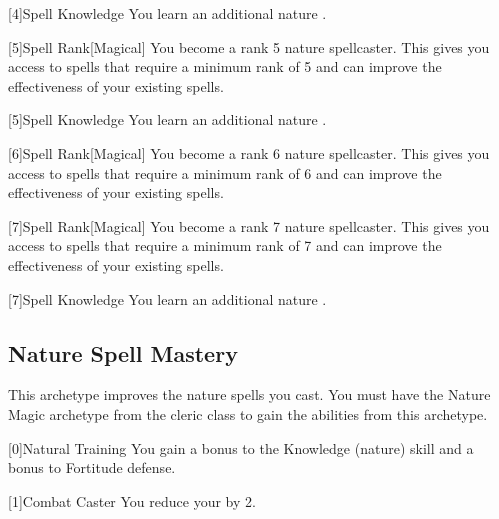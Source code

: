         [4]{Spell Knowledge} You learn an additional nature .

        [5]{Spell Rank}[Magical] You become a rank 5 nature spellcaster.
        This gives you access to spells that require a minimum rank of 5 and can improve the effectiveness of your existing spells.

        [5]{Spell Knowledge} You learn an additional nature .

        [6]{Spell Rank}[Magical] You become a rank 6 nature spellcaster.
        This gives you access to spells that require a minimum rank of 6 and can improve the effectiveness of your existing spells.

        [7]{Spell Rank}[Magical] You become a rank 7 nature spellcaster.
        This gives you access to spells that require a minimum rank of 7 and can improve the effectiveness of your existing spells.

        [7]{Spell Knowledge} You learn an additional nature .

    \newpage
    \subsection{Nature Spell Mastery}
        This archetype improves the nature spells you cast.
        You must have the Nature Magic archetype from the cleric class to gain the abilities from this archetype.

        [0]{Natural Training} You gain a  bonus to the Knowledge (nature) skill and a  bonus to Fortitude defense.

        [1]{Combat Caster} You reduce your  by 2.

